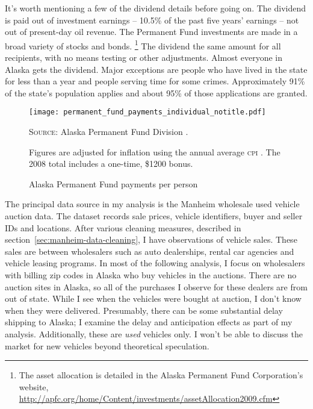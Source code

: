 \documentclass[11pt,letterpaper,oneside]{article}
\newcommand{\snippet}[1]{\hspace{-0.15em}}
\begin{document}
It's worth mentioning a few of the dividend details before going on.
The dividend is paid out of investment earnings -- 10.5\% of the past five years' earnings -- not out of present-day oil revenue.
The Permanent Fund investments are made in a broad variety of stocks and bonds.%
\footnote{The asset allocation is detailed in the Alaska Permanent Fund Corporation's website, \url{http://apfc.org/home/Content/investments/assetAllocation2009.cfm}}
The dividend the same amount for all recipients, with no means testing or other adjustments.
Almost everyone in Alaska gets the dividend.
Major exceptions are people who have lived in the state for less than a year and people serving time for some crimes.
Approximately 91\% of the state's population applies and about 95\% of those applications are granted.

\begin{figure}[bht]
    \caption{\large Alaska Permanent Fund payments per person}
    \texttt{[image: permanent\_fund\_payments\_individual\_notitle.pdf]}
    \label{fig:permanent-fund-payments-individual}

\noindent\textsc{Source:} Alaska Permanent Fund Division \parencite{apfd_payments_summary}.\par
		Figures are adjusted for inflation using the annual average \textsc{cpi} \parencite{fred_inflation}.
		The 2008 total includes a one-time, \$1200 bonus.
\end{figure}


The principal data source in my analysis is the Manheim wholesale used vehicle auction data.
The dataset records sale prices, vehicle identifiers, buyer and seller IDs and locations.
After various cleaning measures, described in section~\ref{sec:manheim-data-cleaning}, I have
\snippet{auctions_cleaned_total_obs_count.tex}
observations of vehicle sales.
These sales are between wholesalers such as auto dealerships, rental car agencies and vehicle leasing programs.
In most of the following analysis, I focus on wholesalers with billing zip codes in Alaska who buy vehicles in the auctions.
There are no auction sites in Alaska, so all of the purchases I observe for these dealers are from out of state.
While I see when the vehicles were bought at auction, I don't know when they were delivered.
Presumably, there can be some substantial delay shipping to Alaska; I examine the delay and anticipation effects as part of my analysis.
Additionally, these are \emph{used} vehicles only.
I won't be able to discuss the market for new vehicles beyond theoretical speculation.
\end{document}
